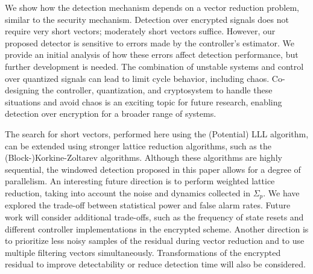 \documentclass[journal, twoside, web]{ieeecolorpreprint}
\begin{document}

We show how the detection mechanism depends on a vector reduction problem, similar to the security mechanism. Detection over encrypted signals does not require very short vectors; moderately short vectors suffice. However, our proposed detector is sensitive to errors made by the controller's estimator. We provide an initial analysis of how these errors affect detection performance, but further development is needed. The combination of unstable systems and control over quantized signals can lead to limit cycle behavior, including chaos. Co-designing the controller, quantization, and cryptosystem to handle these situations and avoid chaos is an exciting topic for future research, enabling detection over encryption for a broader range of systems.

The search for short vectors, performed here using the (Potential) LLL algorithm, can be extended using stronger lattice reduction algorithms, such as the (Block-)Korkine-Zoltarev algorithms. Although these algorithms are highly sequential, the windowed detection proposed in this paper allows for a degree of parallelism. An interesting future direction is to perform weighted lattice reduction, taking into account the noise and dynamics collected in $\Sigma_p$. We have explored the trade-off between statistical power and false alarm rates. Future work will consider additional trade-offs, such as the frequency of state resets and different controller implementations in the encrypted scheme. Another direction is to prioritize less noisy samples of the residual during vector reduction and to use multiple filtering vectors simultaneously. Transformations of the encrypted residual to improve detectability or reduce detection time will also be considered.
\end{document}
